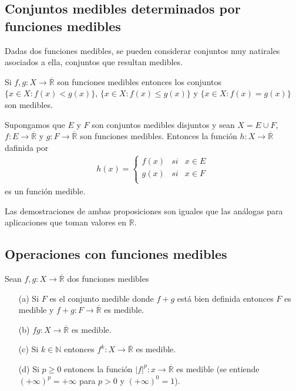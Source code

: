 \subsection{Conjuntos medibles determinados por funciones medibles}
Dadas dos funciones medibles, se pueden considerar conjuntos muy natirales asociados a ella, conjuntos que resultan medibles.

\begin{prop}
Si $f,g: X \longrightarrow \overline{\mathbb{R}}$ son funciones medibles entonces los conjuntos $\{ x \in X : f(x) < g(x)\}$, $\{ x \in X : f(x) \leq g(x)\}$ y $\{ x \in X : f(x) = g(x)\}$ son medibles.
\end{prop}

\begin{prop}
\label{prop:hmedible}
Supongamos que $E$ y $F$ son conjuntos medibles disjuntos y sean $X = E \cup F$, $f: E \longrightarrow \overline{\mathbb{R}}$ y $g: F \longrightarrow \overline{\mathbb{R}}$ son funciones medibles. Entonces la función $h: X \longrightarrow \overline{\mathbb{R}}$ dafinida por
\begin{align*}
    h(x) =  \left\{ \begin{array}{lcc}
             f(x) &  si  &x \in E\\
             g(x) &  si  &x \in F \\
             \end{array}
   \right.
\end{align*}
es un función medible.
\end{prop}
Las demostraciones de ambas proposiciones son iguales que las análogas para aplicaciones que toman valores en $\mathbb{R}$.

\subsection{Operaciones con funciones medibles}

\begin{prop}
\label{prop:fmedibles}
Sean $f,g: X \longrightarrow \overline{\mathbb{R}}$ dos funciones medibles
\begin{enumerate}
    \item[(a)] Si $F$ es el conjunto medible donde $f+g$ está bien definida entonces $F$ es medible y $f+g: F \longrightarrow \overline{\mathbb{R}}$ es medible.
    \item[(b)] $fg: X \longrightarrow \overline{\mathbb{R}}$ es medible.
    \item[(c)] Si $k \in \mathbb{N}$ entonces $f^k: X \longrightarrow \overline{\mathbb{R}}$ es medible.
    \item[(d)] Si $p \ge 0$ entonces la función $|f|^p: x \longrightarrow \overline{\mathbb{R}}$ es medible (se entiende $(+\infty)^p = +\infty$ para $p > 0$ y $(+\infty)^0 = 1$).
\end{enumerate}
\end{prop}

